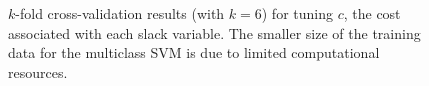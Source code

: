 \documentclass[10pt, twocolumn]{article}
\begin{document}
\begin{figure}
\begin{center}
\caption{$k$-fold cross-validation results (with $k=6$) for tuning $c$, the cost associated with 
each slack variable. The smaller size of the training data for the multiclass SVM is due to 
limited computational resources.}
\label{fig:kfoldc}
\end{center}
\end{figure}
\end{document}
